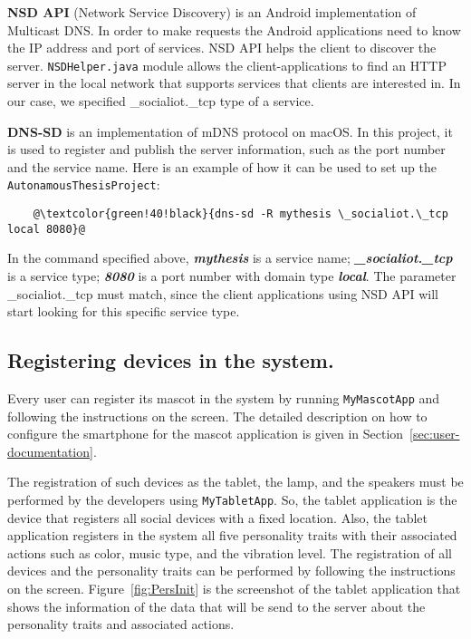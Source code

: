 \textbf{NSD API} (Network Service Discovery) is an Android implementation of Multicast DNS\@.
In order to make requests the Android applications need to know the IP address and port of services.
NSD API helps the client to discover the server.
\texttt{NSDHelper.java} module allows the client-applications to find an HTTP server in the local network that supports
services that clients are interested in.
In our case, we specified \_socialiot.\_tcp type of a service.

\textbf{DNS-SD} is an implementation of mDNS protocol on macOS\@.
In this project, it is used to register and publish the server information, such as the port number and the service name.
Here is an example of how it can be used to set up the \texttt{AutonamousThesisProject}:
\begin{lstlisting}
    @\textcolor{green!40!black}{dns-sd -R mythesis \_socialiot.\_tcp local 8080}@
\end{lstlisting}
In the command specified above, \textbf{\emph{mythesis}} is a service name;
\textbf{\emph{\_socialiot.\_tcp}} is a service type;
\textbf{\emph{8080}} is a port number with domain type \textbf{\emph{local}}.
The parameter \_socialiot.\_tcp must match, since the client applications using NSD API
will start looking for this specific service type.

\subsection{Registering devices in the system.}
\label{subsec:registering-devices-in-the-system.}
Every user can register its mascot in the system by running \texttt{MyMascotApp} and following the instructions on the screen.
The detailed description on how to configure the smartphone for the mascot application is given in
Section~\ref{sec:user-documentation}.

The registration of such devices as the tablet, the lamp, and the speakers must be performed
by the developers using \texttt{MyTabletApp}.
So, the tablet application is the device that registers all social devices with a fixed location.
Also, the tablet application registers in the system all five personality traits with their
associated actions such as color, music type, and the vibration level.
The registration of all devices and the personality traits can be performed by following the instructions on the screen.
Figure~\ref{fig:PersInit} is the screenshot of the tablet application that shows the information of the data that will
be send to the server about the personality traits and associated actions.

